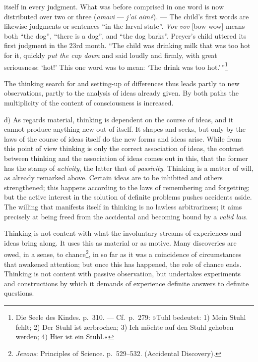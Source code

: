 \documentclass[12pt,a4paper]{book}
\newcommand{\opage}[1]{\marginnote{\footnotesize\textit{[#1]}}}
\begin{document}
itself in every judgment. What was before comprised in one word is now
distributed over two or three (\textit{amavi} --- \textit{j'ai aimé}).
--- The child's first words are likewise judgments or sentences ``in the
larval state''. \textit{Vov-vov} [bow-wow] means both ``the dog'',
``there is a dog'', and ``the dog barks''. Preyer's child uttered its
first judgment in the 23rd month. ``The child was drinking milk that was
too hot for it, quickly \emph{put the cup down}
\opage{220}and said loudly and firmly, with great seriousness: `hot!'
This one word was to mean: `The drink was too hot.'\,''\footnote{Die
Seele des Kindes. p.~310. --- Cf.\ p.~279: »Tuhl bedeutet: 1) Mein Stuhl
fehlt; 2) Der Stuhl ist zerbrochen; 3) Ich möchte auf den Stuhl gehoben
werden; 4) Hier ist ein Stuhl.«}

The thinking search for and setting-up of differences thus leads partly
to new observations, partly to the analysis of ideas already given. By
both paths the multiplicity of the content of consciousness is
increased.

d) As regards material, thinking is dependent on the course of ideas,
and it cannot produce anything new out of itself. It shapes and seeks,
but only by the laws of the course of ideas itself do the new forms and
ideas arise. While from this point of view thinking is only the correct
association of ideas, the contrast between thinking and the association
of ideas comes out in this, that the former has the stamp of
\emph{activity}, the latter that of \emph{passivity}. Thinking is a
matter of will, as already remarked above. Certain ideas are to be
inhibited and others strengthened; this happens according to the laws of
remembering and forgetting; but the active interest in the solution of
definite problems pushes accidents aside. The willing that manifests
itself in thinking is no lawless arbitrariness; it aims precisely at
being freed from the accidental and becoming bound by a \emph{valid
law}.

Thinking is not content with what the involuntary streams of experiences
and ideas bring along. It uses this as material or as motive. Many
discoveries are owed, in a sense, to
chance\footnote{\emph{Jevons}: Principles of Science. p.~529--532.
(Accidental Discovery).}, in so far as it was a coincidence of
circumstances that awakened attention; but once this has happened, the
role of chance ends. Thinking is not content with passive observation,
but undertakes experiments and constructions by which it demands of
experience definite answers to definite questions.
\end{document}
